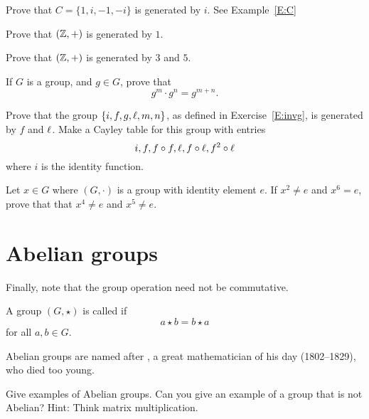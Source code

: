 \documentclass{ximera}
\begin{document}
\begin{exercise}
  Prove that $C =\{1,i,-1,-i\}$ is generated by $i$. See Example~\ref{E:C}
\end{exercise}

\begin{exercise}
  Prove that $(\mathbb Z,+)$ is generated by $1$.
\end{exercise}

\begin{exercise}
  Prove that $(\mathbb Z,+)$ is generated by $3$ and $5$.
\end{exercise}

\begin{exercise}
  If $G$ is a group, and $g\in G$, prove that
  \[
  g^m\cdot g^n = g^{m+n}.
  \]
\end{exercise}

\begin{exercise}
  Prove that the group $\{i,f,g,\ell,m,n\}$, as defined in
  Exercise~\ref{E:invg}, is generated by $f$ and $\ell$. Make a Cayley
  table for this group with entries
  \[
  i, f, f\circ f, \ell, f\circ \ell,f^2\circ \ell
  \]
  where $i$ is the identity function.
\end{exercise}

\begin{exercise}
  Let $x \in G$ where $(G,\cdot)$ is a group with identity element
  $e$. If $x^2 \ne e$ and $x^6 = e$, prove that that $x^4 \ne e$ and
  $x^5 \ne e$.
\end{exercise}


\section{Abelian groups}


Finally, note that the group operation need not be commutative.

\begin{definition}
  A group $(G,\star)$ is called  if
  \[
  a\star b = b\star a
  \]
  for all $a,b\in G$.
\end{definition}

Abelian groups are named after ,
a great mathematician of his day (1802--1829), who died too young. 

\begin{exercise}
  Give examples of Abelian groups. Can you give an example of a group
  that is not Abelian? Hint: Think matrix multiplication.
\end{exercise}
\end{document}
